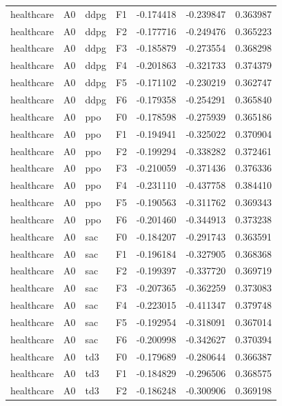 \begin{tabular}{llllrrr}
healthcare &      A0 &      ddpg &  F1 & -0.174418 & -0.239847 &  0.363987 \\
healthcare &      A0 &      ddpg &  F2 & -0.177716 & -0.249476 &  0.365223 \\
healthcare &      A0 &      ddpg &  F3 & -0.185879 & -0.273554 &  0.368298 \\
healthcare &      A0 &      ddpg &  F4 & -0.201863 & -0.321733 &  0.374379 \\
healthcare &      A0 &      ddpg &  F5 & -0.171102 & -0.230219 &  0.362747 \\
healthcare &      A0 &      ddpg &  F6 & -0.179358 & -0.254291 &  0.365840 \\
healthcare &      A0 &       ppo &  F0 & -0.178598 & -0.275939 &  0.365186 \\
healthcare &      A0 &       ppo &  F1 & -0.194941 & -0.325022 &  0.370904 \\
healthcare &      A0 &       ppo &  F2 & -0.199294 & -0.338282 &  0.372461 \\
healthcare &      A0 &       ppo &  F3 & -0.210059 & -0.371436 &  0.376336 \\
healthcare &      A0 &       ppo &  F4 & -0.231110 & -0.437758 &  0.384410 \\
healthcare &      A0 &       ppo &  F5 & -0.190563 & -0.311762 &  0.369343 \\
healthcare &      A0 &       ppo &  F6 & -0.201460 & -0.344913 &  0.373238 \\
healthcare &      A0 &       sac &  F0 & -0.184207 & -0.291743 &  0.363591 \\
healthcare &      A0 &       sac &  F1 & -0.196184 & -0.327905 &  0.368368 \\
healthcare &      A0 &       sac &  F2 & -0.199397 & -0.337720 &  0.369719 \\
healthcare &      A0 &       sac &  F3 & -0.207365 & -0.362259 &  0.373083 \\
healthcare &      A0 &       sac &  F4 & -0.223015 & -0.411347 &  0.379748 \\
healthcare &      A0 &       sac &  F5 & -0.192954 & -0.318091 &  0.367014 \\
healthcare &      A0 &       sac &  F6 & -0.200998 & -0.342627 &  0.370394 \\
healthcare &      A0 &       td3 &  F0 & -0.179689 & -0.280644 &  0.366387 \\
healthcare &      A0 &       td3 &  F1 & -0.184829 & -0.296506 &  0.368575 \\
healthcare &      A0 &       td3 &  F2 & -0.186248 & -0.300906 &  0.369198 \\

\end{tabular}
